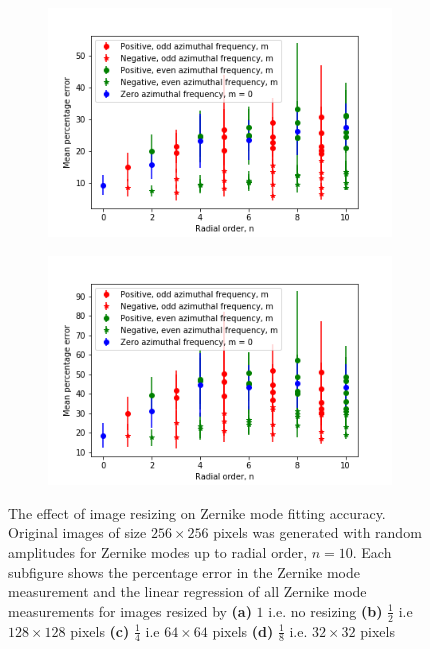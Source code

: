 \begin{figure}[h]
	\begin{subfigure}{0.48\textwidth}
		\centering
		\includegraphics[width=\linewidth]{images/Zernike_fitting_percentage_error_random_modes_repeat_resize_factor_4_order_radial_azimuthal.png}
		\caption{}
		\label{fig:Zernike_fitting_percentage_error_random_modes_repeat_resize_factor_4}
	\end{subfigure}
	\begin{subfigure}{0.48\textwidth}
		\centering
		\includegraphics[width=\linewidth]{images/Zernike_fitting_percentage_error_random_modes_repeat_resize_factor_8_order_radial_azimuthal.png}
		\caption{}
		\label{fig:Zernike_fitting_percentage_error_random_modes_repeat_resize_factor_8}
	\end{subfigure}
	\caption[The effect of image resizing on Zernike mode fitting 	
	accuracy]{The effect of image resizing on Zernike mode fitting accuracy. 
		Original images of size $256\times256$ pixels was generated with 
		random amplitudes for Zernike modes up to radial order, 
		$n = 10$. Each subfigure shows the percentage error in the Zernike 
		mode measurement and the linear regression of all Zernike mode 
		measurements for images resized by \textbf{(a)} $1$ i.e. no resizing 
		\textbf{(b)} $\frac{1}{2}$ i.e $128\times128$ pixels \textbf{(c)} 
		$\frac{1}{4}$ i.e $64\times64$ pixels \textbf{(d)} $\frac{1}{8}$ i.e. 
		$32\times32$ pixels} \label{fig:zernike_fitting_accuracy_resize}
\end{figure}

